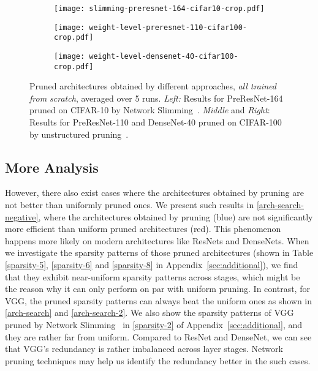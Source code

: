 \begin{figure}[!htbp]
\centering
\begin{minipage}{.325\textwidth}
 \begin{subfigure}{\textwidth}
 \centering
 \texttt{[image: slimming-preresnet-164-cifar10-crop.pdf]}
 \end{subfigure}
\end{minipage}
\begin{minipage}{.325\textwidth}
 \begin{subfigure}{\textwidth}
 \centering
\texttt{[image: weight-level-preresnet-110-cifar100-crop.pdf]}
 \end{subfigure}
\end{minipage}
\begin{minipage}{.325\textwidth}
 \begin{subfigure}{\textwidth}
 \centering
\texttt{[image: weight-level-densenet-40-cifar100-crop.pdf]}
 \end{subfigure}
\end{minipage}
    \caption{
      Pruned architectures obtained by different approaches, \emph{all trained from scratch}, averaged over 5 runs. \emph{Left:} Results for PreResNet-164 pruned on CIFAR-10 by Network Slimming~\cite{liu2017learning}. \emph{Middle} and \emph{Right}: Results for PreResNet-110 and DenseNet-40 pruned on CIFAR-100 by unstructured pruning~\cite{han2015learning}. 
    }
    \label{arch-search-negative}
\end{figure}

\subsection{More Analysis} 
However, there also exist cases where the architectures obtained by pruning are not better than uniformly pruned ones.
We present such results in 
\autoref{arch-search-negative}, where the architectures obtained by pruning (blue) are not significantly more efficient than uniform pruned architectures (red). This phenomenon happens more likely on modern architectures like ResNets and DenseNets. When we investigate the sparsity patterns of those pruned architectures (shown in Table \ref{sparsity-5}, \ref{sparsity-6} and \ref{sparsity-8} in  Appendix~\ref{sec:additional}), we find that they exhibit near-uniform sparsity patterns across stages, which might be the reason why it can only perform on par with uniform pruning. In contrast, for VGG, the pruned sparsity patterns can always beat the uniform ones as shown in \autoref{arch-search} and \autoref{arch-search-2}. We also show the sparsity patterns of VGG pruned by Network Slimming~\cite{liu2017learning} in \autoref{sparsity-2} of Appendix~\ref{sec:additional}, and they are rather far from uniform. Compared to ResNet and DenseNet, we can see that VGG's redundancy is rather imbalanced across layer stages. Network pruning techniques may help us identify the redundancy better in the such cases.

